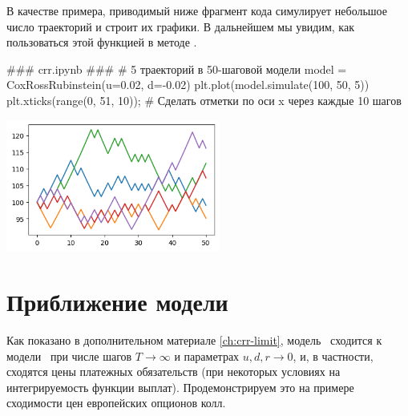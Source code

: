 В качестве примера, приводимый ниже фрагмент кода симулирует небольшое число траекторий и строит их графики.
В дальнейшем мы увидим, как пользоваться этой функцией в методе \mc.
\begin{python}
### crr.ipynb ###
# 5 траекторий в 50-шаговой модели
model = CoxRossRubinstein(u=0.02, d=-0.02)
plt.plot(model.simulate(100, 50, 5))
plt.xticks(range(0, 51, 10)); # Сделать отметки по оси x через каждые 10 шагов
\end{python}

\noindent
\includegraphics[width=7cm]{pic/crr-path-many.png}


\section{Приближение модели \bs}
Как показано в дополнительном материале \ref{ch:crr-limit}, модель \crr\ сходится к модели \bs\ при числе шагов $T\to\infty$ и параметрах $u,d,r\to0$, и, в частности, сходятся цены платежных обязательств (при некоторых условиях на интегрируемость функции выплат).
Продемонстрируем это на примере сходимости цен европейских опционов колл.

